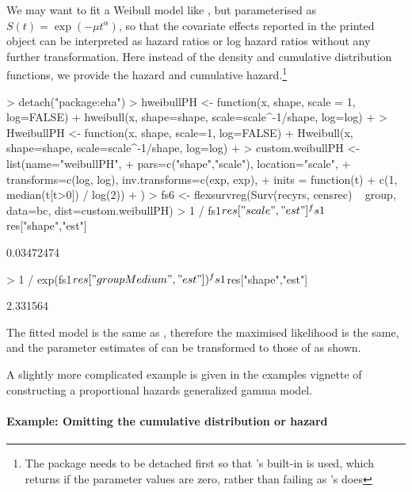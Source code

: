 \documentclass[nojss,nofooter]{jss}
\begin{document}
We may want to fit a Weibull model like , but parameterised as $S(t) =
\exp(-\mu t^\alpha)$, so that the covariate effects reported in the
printed  object can be interpreted as hazard ratios
or log hazard ratios without any further transformation.
Here instead of the density and cumulative distribution functions, we
provide the hazard and cumulative hazard.\footnote{The  package 
needs to be detached first so that 's built-in  is used, which returns  if the parameter values are zero, rather than failing as 's does}
\begin{Schunk}
\begin{Sinput}
> detach("package:eha")
> hweibullPH <- function(x, shape, scale = 1, log=FALSE){
+     hweibull(x, shape=shape, scale=scale^{-1/shape}, log=log)
+ }
> HweibullPH <- function(x, shape, scale=1, log=FALSE){
+     Hweibull(x, shape=shape, scale=scale^{-1/shape}, log=log)
+ }
> custom.weibullPH <- list(name="weibullPH", 
+                          pars=c("shape","scale"), location="scale",
+                          transforms=c(log, log), inv.transforms=c(exp, exp),
+                          inits = function(t){
+                              c(1, median(t[t>0]) / log(2))
+                          })
> fs6 <- flexsurvreg(Surv(recyrs, censrec) ~ group, data=bc, dist=custom.weibullPH)
> 1 / fs1$res["scale","est"]^fs1$res["shape","est"]
\end{Sinput}
\begin{Soutput}
[1] 0.03472474
\end{Soutput}
\begin{Sinput}
> 1 / exp(fs1$res["groupMedium","est"]) ^ fs1$res["shape","est"]
\end{Sinput}
\begin{Soutput}
[1] 2.331564
\end{Soutput}
\end{Schunk}
The fitted model is the same as , therefore the maximised likelihood is the same,
and the parameter estimates of  can be transformed to those of  as shown.

A slightly more complicated example is given in the examples vignette
of constructing a proportional hazards generalized gamma model.


\paragraph{Example: Omitting the cumulative distribution or hazard}
\end{document}
